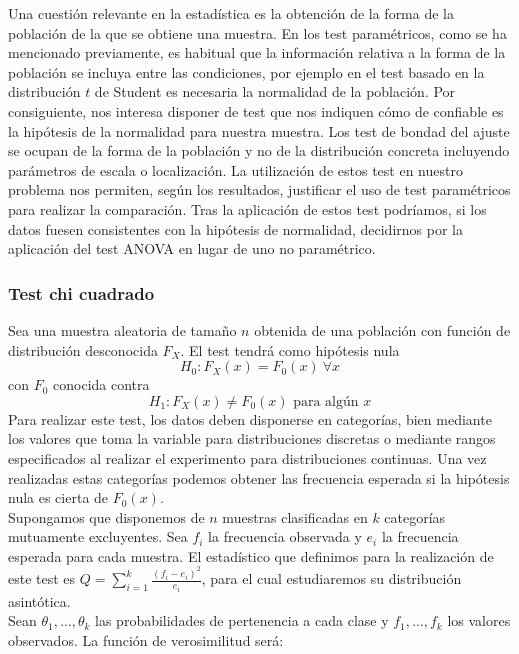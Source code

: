 	Una cuestión relevante en la estadística es la obtención 
de la forma de la población de la que se obtiene una muestra. 
En los test paramétricos, como se ha mencionado previamente, 
es habitual que la información relativa a la forma de la 
población se incluya entre las condiciones, por ejemplo en el 
test basado en la distribución $t$ de Student es necesaria la 
normalidad de la población. Por consiguiente, nos interesa 
disponer de test que nos indiquen cómo de confiable es la 
hipótesis de la normalidad para nuestra muestra. Los test de 
bondad del ajuste se ocupan de la forma de la población y no 
de la distribución concreta incluyendo parámetros de escala o 
localización. La utilización de estos test en nuestro problema
nos permiten, según los resultados, justificar el
uso de test paramétricos para realizar la comparación. Tras
la aplicación de estos test podríamos, si los datos
fuesen consistentes con la hipótesis de normalidad,
decidirnos por la aplicación del test ANOVA en lugar
de uno no paramétrico.
	
\subsubsection{Test chi cuadrado}

	Sea una muestra aleatoria de tamaño $n$ obtenida de una 
población con función de distribución desconocida $F_X$. El 
test tendrá como hipótesis nula
		\[ H_0: F_X(x) = F_0(x) \ \forall x \]
	con $F_0$ conocida contra
		\[ H_1: F_X(x) \neq F_0(x) \text{ para algún }  x \]
	Para realizar este test, los datos deben disponerse en
categorías, bien mediante los valores que toma la variable 
para distribuciones discretas o mediante rangos especificados 
al realizar el experimento para distribuciones continuas. Una 
vez realizadas estas categorías podemos obtener las 
frecuencia esperada si la hipótesis nula es cierta de 
$F_0(x)$.\\
	
	Supongamos que disponemos de $n$ muestras clasificadas en 
$k$ categorías mutuamente excluyentes. Sea $f_i$ la 
frecuencia observada y $e_i$ la frecuencia esperada para cada 
muestra. El estadístico que definimos para la realización de 
este test es $Q = \sum\limits_{i=1}^k 
\frac{(f_i-e_i)^2}{e_i}$, para el cual estudiaremos su 
distribución asintótica.\\
	
	Sean $\theta_1, \dots, \theta_k$ las probabilidades de 
pertenencia a cada clase y $f_1, \dots, f_k$ los valores 
observados. La función de verosimilitud será:
	
